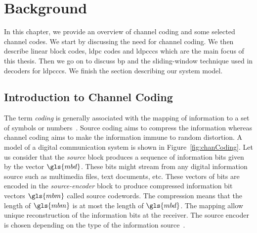 \chapter{Background}
In this chapter, we provide an overview of channel coding and some selected channel codes. We start by discussing the need for channel coding. We then describe linear block codes, \gls{ldpc} codes and \glspl{ldpccc} which are the main focus of this thesis. Then we go on to discuss \gls{bp} and the sliding-window technique used in decoders for \glspl{ldpccc}. We finish the section describing our system model.

\section{Introduction to Channel Coding}
The term \emph{coding} is generally associated with the mapping of information to a set of symbols or numbers~\cite{Bossert}. Source coding aims to compress the information whereas channel coding aims to make the information immune to random distortion. A model of a digital communication system is shown in Figure~\ref{fig:chanCoding}. Let us consider that the \emph{source} block produces a sequence of information bits given by the vector $\gls{mbd}$. These bits might stream from any digital information source such as multimedia files, text documents, etc. These vectors of bits are encoded in the \emph{source-encoder} block to produce compressed information bit vectors $\gls{mbm}$ called source codewords. The compression means that the length of $\gls{mbm}$ is at most the length of $\gls{mbd}$. The mapping allow unique reconstruction of the information bits at the receiver. The source encoder is chosen depending on the type of the information source~\cite{proak}.

